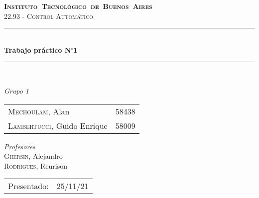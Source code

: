 \begin{titlepage}
\newcommand{\HRule}{\rule{\linewidth}{0.5mm}}
\center
\mbox{\textsc{\LARGE \bfseries {Instituto Tecnológico de Buenos Aires}}}\\[1.5cm]
\textsc{\Large 22.93 - Control Automático}\\[0.5cm]


\HRule \\[0.6cm]
{ \Huge \bfseries Trabajo práctico N$^{\circ}$1}\\[0.4cm] 
\HRule \\[1.5cm]


{\large

\emph{Grupo 1}\\
\vspace{3pt}

\begin{tabular}{lr} 	
\textsc{Mechoulam}, Alan  &  58438\\
\textsc{Lambertucci}, Guido Enrique  & 58009 \\
\end{tabular}

\vspace{20pt}

\emph{Profesores}\\
\textsc{Ghersin}, Alejandro\\
\textsc{Rodrigues}, Reurison\\



\vspace{3pt}

\vspace{100pt}

\begin{tabular}{ll}

Presentado: & 25/11/21\\

\end{tabular}

}

\vfill

\end{titlepage}

